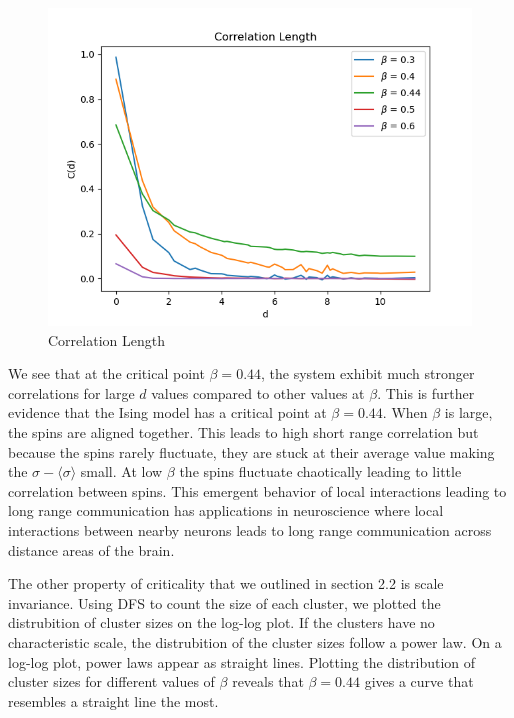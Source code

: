 \documentclass{article}
\begin{document}
\begin{figure}[ht]
    \includegraphics[width=\columnwidth]{plots/corr_len.png}
    \caption{Correlation Length}
    \label{fig:5}
\end{figure}
We see that at the critical point $\beta = 0.44$, the system exhibit much stronger correlations for large $d$ values
compared to other values at $\beta$. This is further evidence that the Ising model has a critical point at $\beta = 0.44$.
When $\beta$ is large, the spins are aligned together. This leads to high short range correlation but because the spins rarely fluctuate, 
they are stuck at their average value making the $\sigma - \langle \sigma \rangle$ small. At low $\beta$ the spins fluctuate chaotically 
leading to little correlation between spins. This emergent behavior of local interactions leading to long range communication has applications in
neuroscience where local interactions between nearby neurons leads to long range communication across distance areas of the brain.

The other property of criticality that we outlined in section 2.2 is scale invariance. 
Using DFS to count the size of each cluster, we plotted the distrubition of cluster sizes on the log-log plot. 
If the clusters have no characteristic scale, the distrubition of the cluster sizes follow a power law. 
On a log-log plot, power laws appear as straight lines. Plotting the distribution of cluster sizes for different
values of $\beta$ reveals that $\beta = 0.44$ gives a curve that resembles a straight line the most.
\end{document}
